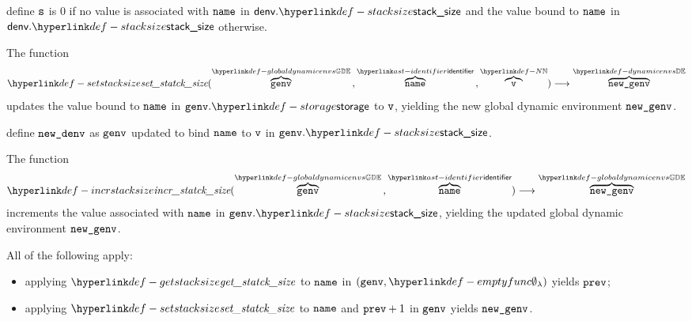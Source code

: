 \ProseParagraph
define $\vs$ is $0$ if no value is associated with $\name$ in $\denv.\stacksize$ and the value bound to
$\name$ in $\denv.\stacksize$ otherwise.

\FormallyParagraph
\begin{mathpar}
\end{mathpar}

\hypertarget{def-setstacksize}{}
The function
\[
\setstacksize(\overname{\genv}{\globaldynamicenvs} \aslsep \overname{\name}{\identifier} \aslsep \overname{\vv}{\N}) \aslto
\overname{\newgenv}{\dynamicenvs}
\]
updates the value bound to $\name$ in $\genv.\storage$ to $\vv$, yielding the new global dynamic environment $\newgenv$.

\ProseParagraph
define $\newdenv$ as $\genv$ updated to bind $\name$ to $\vv$ in $\genv.\stacksize$.

\FormallyParagraph
\begin{mathpar}
\end{mathpar}

\hypertarget{def-incrstacksize}{}
The function
\[
\incrstacksize(\overname{\genv}{\globaldynamicenvs} \aslsep \overname{\name}{\identifier}) \aslto
\overname{\newgenv}{\globaldynamicenvs}
\]
increments the value associated with $\name$ in $\genv.\stacksize$, yielding the updated global dynamic environment $\newgenv$.

\ProseParagraph
All of the following apply:
\begin{itemize}
  \item applying $\getstacksize$ to $\name$ in $(\genv, \emptyfunc)$ yields $\vprev$;
  \item applying $\setstacksize$ to $\name$ and $\vprev + 1$ in $\genv$ yields $\newgenv$.
\end{itemize}

\FormallyParagraph
\begin{mathpar}
\end{mathpar}

